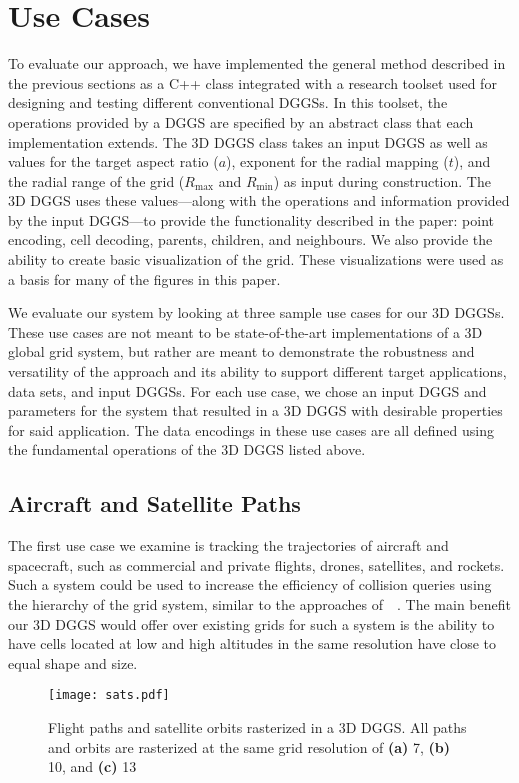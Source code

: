 \chapter{Use Cases}
To evaluate our approach, we have implemented the general method described in the previous sections as a C++ class integrated with a research toolset used for designing and testing different conventional DGGSs.
In this toolset, the operations provided by a DGGS are specified by an abstract class that each implementation extends.
The 3D DGGS class takes an input DGGS as well as values for the target aspect ratio ($a$), exponent for the radial mapping ($t$), and the radial range of the grid ($R_\mathrm{max}$ and $R_\mathrm{min}$) as input during construction.
The 3D DGGS uses these values---along with the operations and information provided by the input DGGS---to provide the functionality described in the paper: point encoding, cell decoding, parents, children, and neighbours.
We also provide the ability to create basic visualization of the grid.
These visualizations were used as a basis for many of the figures in this paper.


We evaluate our system by looking at three sample use cases for our 3D DGGSs.
These use cases are not meant to be state-of-the-art implementations of a 3D global grid system, but rather are meant to demonstrate the robustness and versatility of the approach and its ability to support different target applications, data sets, and input DGGSs.
For each use case, we chose an input DGGS and parameters for the system that resulted in a 3D DGGS with desirable properties for said application.
The data encodings in these use cases are all defined using the fundamental operations of the 3D DGGS listed above.


\section{Aircraft and Satellite Paths}
The first use case we examine is tracking the trajectories of aircraft and spacecraft, such as commercial and private flights, drones, satellites, and rockets.
Such a system could be used to increase the efficiency of collision queries using the hierarchy of the grid system, similar to the approaches of~~\cite{miao2019low, zhai2019collision}.
The main benefit our 3D DGGS would offer over existing grids for such a system is the ability to have cells located at low and high altitudes in the same resolution have close to equal shape and size.


\begin{figure}[h]
	\centering
	\texttt{[image: sats.pdf]}
	\caption{Flight paths and satellite orbits rasterized in a 3D DGGS.
		All paths and orbits are rasterized at the same grid resolution of \textbf{(a)} 7, \textbf{(b)} 10, and \textbf{(c)} 13}
	\label{fig:satellites}
\end{figure}


